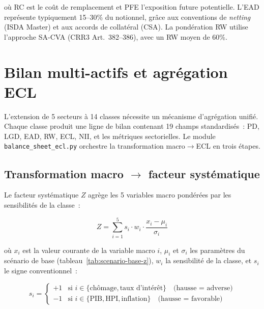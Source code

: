 \documentclass[12pt, a4paper, twoside, openright]{report}
\theoremstyle{definition}
\begin{document}
\noindent où RC est le coût de remplacement et PFE l'exposition future potentielle. L'EAD représente typiquement 15--30\% du notionnel, grâce aux conventions de \textit{netting} (ISDA Master) et aux accords de collatéral (CSA). La pondération RW utilise l'approche SA-CVA (CRR3 Art.~382--386), avec un RW moyen de 60\%.


\section{Bilan multi-actifs et agrégation ECL}
\label{sec:multi-bilan}

L'extension de 5 secteurs à 14 classes nécessite un mécanisme d'agrégation unifié. Chaque classe produit une ligne de bilan contenant 19 champs standardisés~: PD, LGD, EAD, RW, ECL, NII, et les métriques sectorielles. Le module \texttt{balance\_sheet\_ecl.py} orchestre la transformation macro$\to$ECL en trois étapes.

\subsection{Transformation macro $\to$ facteur systématique}

Le facteur systématique $Z$ agrège les 5 variables macro pondérées par les sensibilités de la classe~:

\begin{equation}
Z = \sum_{i=1}^{5} s_i \cdot w_i \cdot \frac{x_i - \mu_i}{\sigma_i}
\label{eq:macro-to-z}
\end{equation}

\noindent où $x_i$ est la valeur courante de la variable macro $i$, $\mu_i$ et $\sigma_i$ les paramètres du scénario de base (tableau~\ref{tab:scenario-base-z}), $w_i$ la sensibilité de la classe, et $s_i$ le signe conventionnel~:

\begin{equation}
s_i = \begin{cases}
+1 & \text{si } i \in \{\text{chômage}, \text{taux d'intérêt}\} \quad \text{(hausse = adverse)} \\
-1 & \text{si } i \in \{\text{PIB}, \text{HPI}, \text{inflation}\} \quad \text{(hausse = favorable)}
\end{cases}
\label{eq:signe-z}
\end{equation}
\end{document}
